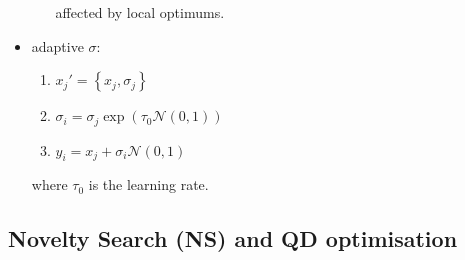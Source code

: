 \documentclass[twocolumn,landscape,10pt]{article}
\theoremstyle{definition}
\begin{document}
\begin{itemize}
\begin{itemize}
                affected by local optimums.
        \end{itemize} 
    \item adaptive $\sigma$:
        \begin{enumerate}
            \item $x_j' = \left\{x_j, \sigma_j\right\}$
            \item $\sigma_i=\sigma_j\exp\left(\tau_0\mathcal{N}(0,1)\right)$
            \item $y_i=x_j+\sigma_i\mathcal{N}(0,1)$
        \end{enumerate} 
        where $\tau_0$ is the learning rate.
\end{itemize} 

\subsection{Novelty Search (NS) and QD optimisation}
\end{document}
